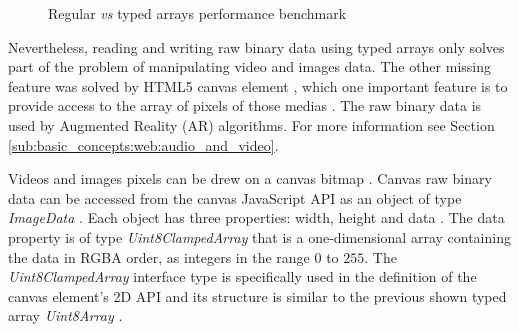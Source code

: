 \begin{figure}[!htb]
  \caption{Regular \textit{vs} typed arrays performance benchmark}
  \label{figure:typed_arrays_performance}
\end{figure}

Nevertheless, reading and writing raw binary data \cite{Canvas2013} \cite{TypedArray2013} using typed arrays only solves part of the problem of manipulating video and images data. The other missing feature was solved by HTML5 \cite{Hickson2013} canvas element \cite{Canvas2013}, which one important feature is to provide access to the array of pixels of those medias \cite{Canvas2013} \cite{Hickson2013}. The raw binary data is used by Augmented Reality (AR) algorithms. For more information see Section \ref{sub:basic_concepts:web:audio_and_video}.

 Videos and images pixels can be drew on a canvas bitmap \cite{Canvas2013}. Canvas raw binary data can be accessed from the canvas JavaScript API as an object of type \textit{ImageData} \cite{Canvas2013}. Each object has three properties: width, height and data \cite{Canvas2013} \cite{MDN2013}. The data property is of type \textit{Uint8ClampedArray} \cite{TypedArray2013} that is a one-dimensional array containing the data in RGBA \cite{Gonzalez2007} order, as integers in the range $0$ to $255$. The \textit{Uint8ClampedArray} \cite{TypedArray2013} interface type is specifically used in the definition of the canvas element's 2D API and its structure is  similar to the previous shown typed array \textit{Uint8Array} \cite{Canvas2013} \cite{TypedArray2013}.

